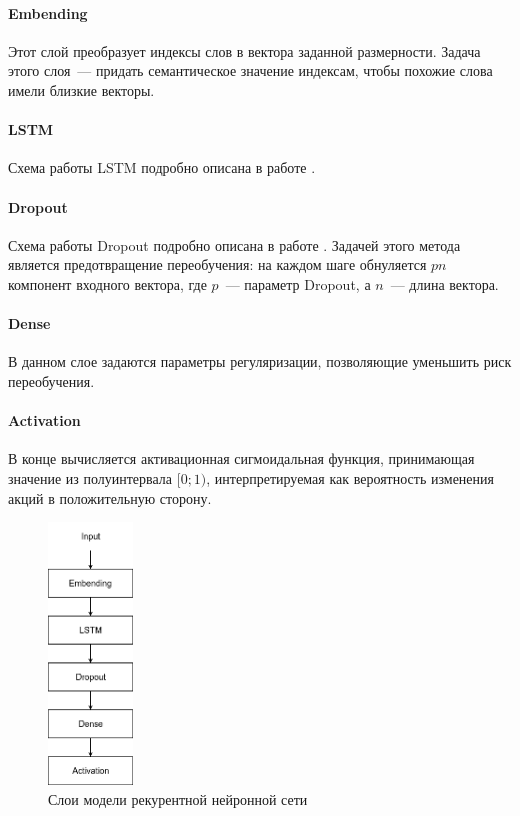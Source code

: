 \documentclass[14pt]{matmex-diploma-custom}
\begin{document}
\paragraph{Embending}

Этот слой преобразует индексы слов в вектора заданной размерности. Задача этого слоя~--- придать семантическое значение индексам, чтобы похожие слова имели близкие векторы.

\paragraph{LSTM}

Схема работы LSTM подробно описана в работе \cite{tools:lstm}.

\paragraph{Dropout}

Схема работы Dropout подробно описана в работе \cite{tools:dropout}. Задачей этого метода является предотвращение переобучения: на каждом шаге обнуляется $pn$ компонент входного вектора, где $p$~--- параметр Dropout, а $n$~--- длина вектора.

\paragraph{Dense}

В данном слое задаются параметры регуляризации, позволяющие уменьшить риск переобучения.

\paragraph{Activation}

В конце вычисляется активационная сигмоидальная функция, принимающая значение из полуинтервала $[0;1)$, интерпретируемая как вероятность изменения акций в положительную сторону.

\begin{figure}[h]
\centering
\includegraphics[width=0.2\textwidth]{img/layers}
\caption{Слои модели рекурентной нейронной сети}
\label{img:layers}
\end{figure}
\end{document}
